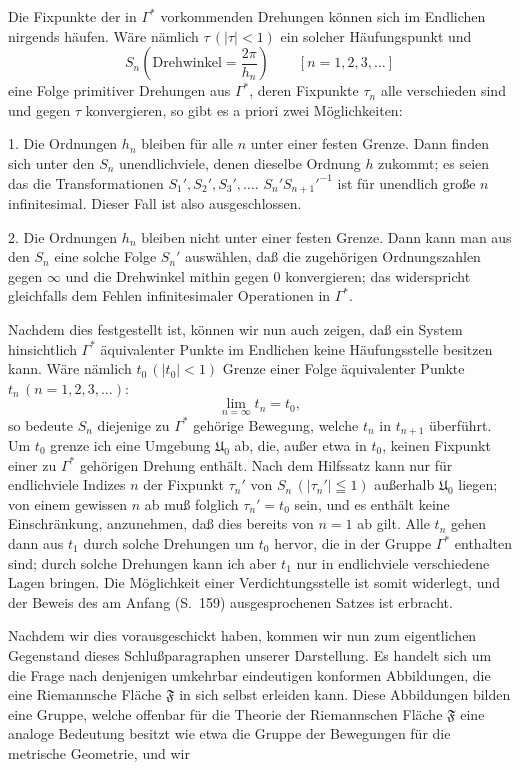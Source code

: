 \documentclass{article}
\begin{document}
Die Fixpunkte der in $\varGamma^*$ vorkommenden Drehungen können sich im Endlichen nirgends häufen. Wäre nämlich $\tau\,(|\tau| < 1)$ ein solcher Häufungspunkt und
\[ S_n \left( \text{Drehwinkel} = \frac{2\pi}{h_n} \right) \qquad [n = 1, 2, 3, \dots] \]
eine Folge primitiver Drehungen aus $\varGamma^*$, deren Fixpunkte $\tau_n$ alle verschieden sind und gegen $\tau$ konvergieren, so gibt es a priori zwei Möglichkeiten:

1. Die Ordnungen $h_n$ bleiben für alle $n$ unter einer festen Grenze. Dann finden sich unter den $S_n$ unendlichviele, denen dieselbe Ordnung $h$ zukommt; es seien das die Transformationen $S_1', S_2', S_3', \dots$. $S_n' S_{n+1}'^{-1}$ ist für unendlich große $n$ infinitesimal. Dieser Fall ist also ausgeschlossen.

2. Die Ordnungen $h_n$ bleiben nicht unter einer festen Grenze. Dann kann man aus den $S_n$ eine solche Folge $S_n'$ auswählen, daß die zugehörigen Ordnungszahlen gegen $\infty$ und die Drehwinkel mithin gegen $0$ konvergieren; das widerspricht gleichfalls dem Fehlen infinitesimaler Operationen in $\varGamma^*$.

Nachdem dies festgestellt ist, können wir nun auch zeigen, daß ein System hinsichtlich $\varGamma^*$ äquivalenter Punkte im Endlichen keine Häufungsstelle besitzen kann. Wäre nämlich $t_0\,(|t_0| < 1)$ Grenze einer Folge äquivalenter Punkte $t_n\,(n = 1, 2, 3, \dots)\colon$
\[ \lim_{n = \infty} t_n = t_0, \]
so bedeute $S_n$ diejenige zu $\varGamma^*$ gehörige Bewegung, welche $t_n$ in $t_{n+1}$ überführt. Um $t_0$ grenze ich eine Umgebung $\mathfrak{U}_0$ ab, die, außer etwa in $t_0$, keinen Fixpunkt einer zu $\varGamma^*$ gehörigen Drehung enthält. Nach dem Hilfssatz kann nur für endlichviele Indizes $n$ der Fixpunkt $\tau_n'$ von $S_n\,(|\tau_n'| \leqq 1)$ außerhalb $\mathfrak{U}_0$ liegen; von einem gewissen $n$ ab muß folglich $\tau_n' = t_0$ sein, und es enthält keine Einschränkung, anzunehmen, daß dies bereits von $n = 1$ ab gilt. Alle $t_n$ gehen dann aus $t_1$ durch solche Drehungen um $t_0$ hervor, die in der Gruppe $\varGamma^*$ enthalten sind; durch solche Drehungen kann ich aber $t_1$ nur in endlichviele verschiedene Lagen bringen. Die Möglichkeit einer Verdichtungsstelle ist somit widerlegt, und der Beweis des am Anfang (S.~159) ausgesprochenen Satzes ist erbracht.

Nachdem wir dies vorausgeschickt haben, kommen wir nun zum eigentlichen Gegenstand dieses Schlußparagraphen unserer Darstellung. Es handelt sich um die Frage nach denjenigen umkehrbar eindeutigen konformen Abbildungen, die eine Riemannsche Fläche $\mathfrak{F}$ in sich selbst erleiden kann. Diese Abbildungen bilden eine Gruppe, welche offenbar für die Theorie der Riemannschen Fläche $\mathfrak{F}$ eine analoge Bedeutung besitzt wie etwa die Gruppe der Bewegungen für die metrische Geometrie, und wir
\end{document}
